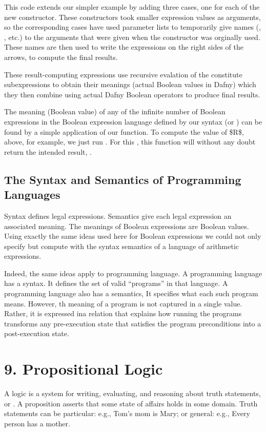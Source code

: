 \documentclass[letterpaper,10pt,english]{sphinxmanual}
\begin{document}
This code extends our simpler example by adding three cases, one for
each of the new constructor. These constructors took smaller
expression values as arguments, so the corresponding cases have used
parameter lists to temporarily give names (, , etc.) to the
arguments that were given when the constructor was orginally used.
These names are then used to write the expressions on the right sides
of the arrows, to compute the final results.

These result-computing expressions use recursive evalation of the
constitute subexpressions to obtain their meanings (actual Boolean
values in Dafny) which they then combine using actual Dafny Boolean
operators to produce final results.

The meaning (Boolean value) of any of the infinite number of Boolean
expressions in the Boolean expression language defined by our syntax
(or ) can be found by a simple application of our 
function. To compute the value of \$R\$, above, for example, we just run
. For this , this function will without any doubt return
the intended result, .


\section{The Syntax and Semantics of Programming Languages}
\label{\detokenize{08-boolean-algebra:the-syntax-and-semantics-of-programming-languages}}
Syntax defines legal expressions. Semantics give each legal expression
an associated meaning. The meanings of Boolean expressions are Boolean
values. Using exactly the same ideas used here for Boolean expressions
we could not only specify but compute with the syntax semantics of a
language of arithmetic expressions.

Indeed, the same ideas apply to programming language. A programming
language has a syntax. It defines the set of valid “programs” in that
language. A programming language also has a semantics, It specifies
what each such program means. However, th meaning of a program is not
captured in a single value. Rather, it is expressed ina relation that
explains how running the programs transforms any pre-execution state
that satisfies the program preconditions into a post-execution state.


\chapter{9. Propositional Logic}
\label{\detokenize{09-propositional-logic:propositional-logic}}\label{\detokenize{09-propositional-logic::doc}}
A logic is a system for writing, evaluating, and reasoning about truth
statements, or . A proposition asserts that some state
of affairs holds in some domain. Truth statements can be particular:
e.g., Tom’s mom is Mary; or general: e.g., Every person has a mother.
\end{document}
